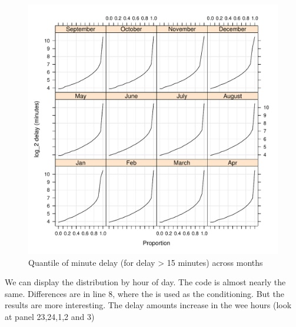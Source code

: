 \documentclass[letterpaper,10pt,english]{sphinxmanual}
\begin{document}
\begin{figure}[htbp]
\centering
\capstart

\includegraphics{quantiles_by_month.pdf}
\caption{Quantile of minute delay (for delay \textgreater{} 15 minutes) across months}\end{figure}

We can display the distribution by hour of day. The code is almost nearly the
same. Differences are in line 8, where the  is used as the conditioning.
But the results are more interesting. The delay amounts increase in the wee
hours (look at panel 23,24,1,2 and 3)
\end{document}
